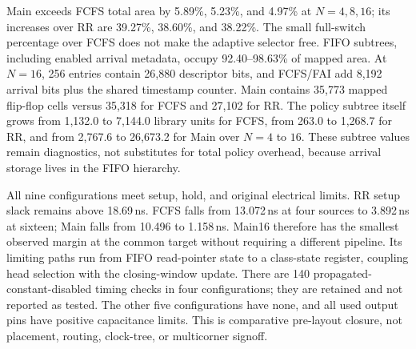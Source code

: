 Main exceeds FCFS total area by 5.89\%, 5.23\%, and 4.97\% at $N=4,8,16$; its increases over RR are 39.27\%, 38.60\%, and 38.22\%. The small full-switch percentage over FCFS does not make the adaptive selector free. FIFO subtrees, including enabled arrival metadata, occupy 92.40--98.63\% of mapped area. At $N=16$, 256 entries contain 26,880 descriptor bits, and FCFS/FAI add 8,192 arrival bits plus the shared timestamp counter. Main contains 35,773 mapped flip-flop cells versus 35,318 for FCFS and 27,102 for RR. The policy subtree itself grows from 1,132.0 to 7,144.0 library units for FCFS, from 263.0 to 1,268.7 for RR, and from 2,767.6 to 26,673.2 for Main over $N=4$ to $16$. These subtree values remain diagnostics, not substitutes for total policy overhead, because arrival storage lives in the FIFO hierarchy.

All nine configurations meet setup, hold, and original electrical limits. RR setup slack remains above 18.69\,ns. FCFS falls from 13.072\,ns at four sources to 3.892\,ns at sixteen; Main falls from 10.496 to 1.158\,ns. Main16 therefore has the smallest observed margin at the common target without requiring a different pipeline. Its limiting paths run from FIFO read-pointer state to a class-state register, coupling head selection with the closing-window update. There are 140 propagated-constant-disabled timing checks in four configurations; they are retained and not reported as tested. The other five configurations have none, and all used output pins have positive capacitance limits. This is comparative pre-layout closure, not placement, routing, clock-tree, or multicorner signoff.

